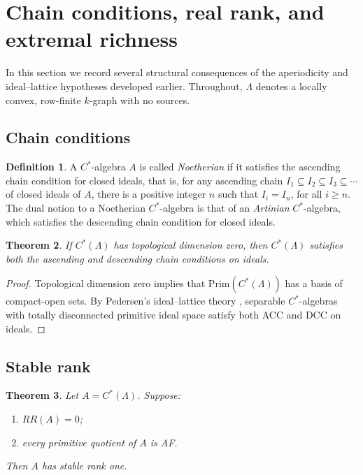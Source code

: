 \documentclass[12pt]{amsart}
\theoremstyle{plain}
\newtheorem{theorem}{Theorem}[section]
\theoremstyle{definition}
\newtheorem{definition}[theorem]{Definition}
\theoremstyle{remark}
\newcommand{\Prim}{\mathrm{Prim}}
\begin{document}
\section{Chain conditions, real rank, and extremal richness}\label{sec:chain}

In this section we record several structural consequences of the
aperiodicity and ideal–lattice hypotheses developed earlier. Throughout,
$\Lambda$ denotes a locally convex, row-finite $k$-graph with no sources.

\subsection{Chain conditions}

\begin{definition}
A $C^*$-algebra $A$ is called \emph{Noetherian} if it satisfies the ascending chain condition for closed ideals, that is, for any ascending chain $I_1 \subseteq I_2 \subseteq I_3 \subseteq \cdots$ of closed ideals of $A$, there is a positive integer $n$ such that $I_i = I_n$, for all $i \geq n$. The dual notion to a Noetherian $C^*$-algebra is that of an \emph{Artinian} $C^*$-algebra, which satisfies the descending chain condition for closed ideals. 
\end{definition}

\begin{theorem}\label{thm:chain-conditions}
If $C^*(\Lambda)$ has topological dimension zero, then $C^*(\Lambda)$
satisfies both the ascending and descending chain conditions on ideals.
\end{theorem}

\begin{proof}
Topological dimension zero implies that $\Prim(C^*(\Lambda))$ has a basis
of compact-open sets. By Pedersen's ideal–lattice theory
\cite[Theorem~4.4.6]{Ped}, separable $C^*$-algebras with totally
disconnected primitive ideal space satisfy both ACC and DCC on ideals.
\end{proof}

\subsection{Stable rank}

\begin{theorem}\label{thm:stable-rank}
Let $A=C^*(\Lambda)$. Suppose:
\begin{enumerate}
\item $RR(A)=0$;
\item every primitive quotient of $A$ is AF.
\end{enumerate}
Then $A$ has stable rank one.
\end{theorem}
\end{document}
